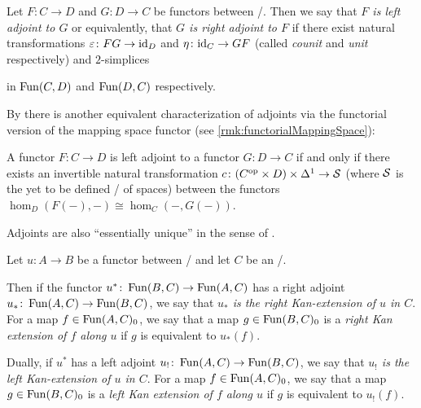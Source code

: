 \begin{definition}[Adjoints]
    Let $F\colon C\to D$ and $G\colon D\to C$ be functors between \inftycats/.
    Then we say that \emph{$F$ is left adjoint to $G$} or equivalently, that \emph{$G$ is right adjoint to $F$}
    if there exist natural transformations $\varepsilon\colon FG\to \text{id}_D$ and $\eta\colon\text{id}_C\to GF$ (called \emph{counit} and \emph{unit} respectively) and $2$-simplices 
    \begin{center}
    \end{center}
    in $\operatorname{Fun}(C,D)$ and $\operatorname{Fun}(D,C)$ respectively.
\end{definition}
\begin{remark}\label{rmk:homAdjunction}
    By \cite[Theorem 6.1.23]{cisinski_2019} there is another equivalent characterization of adjoints via the functorial version of the mapping space functor (see \cref{rmk:functorialMappingSpace}):
    
    A functor $F\colon C\to D$ is left adjoint to a functor $G\colon D\to C$ if and only if there exists an invertible natural transformation $c\colon (C^{\operatorname{op}}\times D)\times\Delta^1 \to\mathcal{S}$ (where $\mathcal{S}$ is the yet to be defined \inftycat/ of spaces) between the functors $\hom_D(F(-),-)\cong\hom_C(-,G(-))$.

    Adjoints are also ``essentially unique'' in the sense of \cite[Proposition 6.1.9]{cisinski_2019}.
\end{remark}
\begin{definition}
    Let $u\colon A\to B$ be a functor between \inftycats/ and let $C$ be an \inftycat/.
    
    Then if the functor $u^*\colon\operatorname{Fun}(B,C)\to\operatorname{Fun}(A,C)$ has a right adjoint $u_*\colon\operatorname{Fun}(A,C)\to\operatorname{Fun}(B,C)$, we say that \emph{$u_*$ is the right Kan-extension of $u$ in $C$}.
    For a map $f\in\operatorname{Fun}(A,C)_0$, we say that a map $g\in\operatorname{Fun}(B,C)_0$ is a \emph{right Kan extension of $f$ along $u$} if $g$ is equivalent to $u_*(f)$.

    Dually, if $u^*$ has a left adjoint $u_!\colon\operatorname{Fun}(A,C)\to\operatorname{Fun}(B,C)$, we say that \emph{$u_!$ is the left Kan-extension of $u$ in $C$}.
    For a map $f\in\operatorname{Fun}(A,C)_0$, we say that a map $g\in\operatorname{Fun}(B,C)_0$ is a \emph{left Kan extension of $f$ along $u$} if $g$ is equivalent to $u_!(f)$.
\end{definition}
